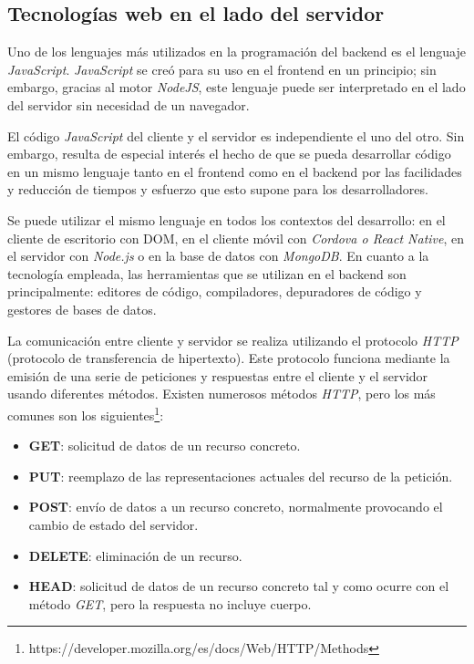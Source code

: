\subsection{Tecnologías web en el lado del servidor}
Uno de los lenguajes más utilizados en la programación del backend es el lenguaje \textit{JavaScript}. \textit{JavaScript} se creó para su uso en el frontend en un principio; sin embargo, gracias al motor \textit{NodeJS}, este lenguaje puede ser interpretado en el lado del servidor sin necesidad de un navegador. \newline


El código \textit{JavaScript}  del cliente y el servidor es independiente el uno del otro. Sin embargo, resulta de especial interés el hecho de que se pueda desarrollar código en un mismo lenguaje tanto en el frontend como en el backend por las facilidades y reducción de tiempos y esfuerzo que esto supone para los desarrolladores. \newline
 
Se puede utilizar el mismo lenguaje en todos los contextos del desarrollo: en el cliente de escritorio con DOM, en el cliente móvil con \textit{Cordova o React Native}, en el servidor con \textit{Node.js} o en la base de datos con \textit{MongoDB}. En cuanto a la tecnología empleada, las herramientas que se utilizan en el backend son principalmente: editores de código, compiladores, depuradores de código y gestores de bases de datos. \newline

La comunicación entre cliente y servidor se realiza utilizando el protocolo \textit{HTTP} (protocolo de transferencia de hipertexto). Este protocolo funciona mediante la emisión de una serie de peticiones y respuestas entre el cliente y el servidor usando diferentes métodos. Existen numerosos métodos \textit{HTTP}, pero los más comunes son los siguientes\footnote{https://developer.mozilla.org/es/docs/Web/HTTP/Methods}:

\begin{itemize}
    \item \textbf{GET}: solicitud de datos de un recurso concreto.
    \item \textbf{PUT}: reemplazo de las representaciones actuales del recurso de la petición.
    \item \textbf{POST}: envío de datos a un recurso concreto, normalmente provocando el cambio de estado del servidor.
    \item \textbf{DELETE}: eliminación de un recurso.
     \item \textbf{HEAD}: solicitud de datos de un recurso concreto tal y como ocurre con el método \textit{GET}, pero la respuesta no incluye cuerpo.
\end{itemize}

